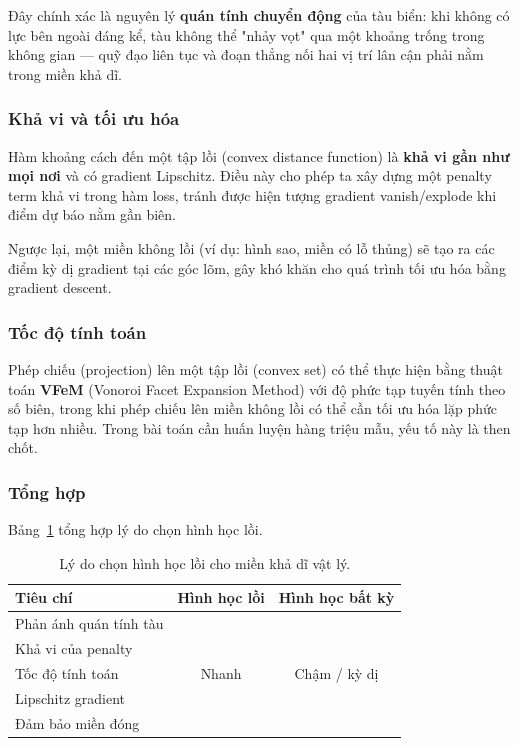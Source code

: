 \documentclass{IEEEtran}
\DeclareRobustCommand{\cmark}{\ding{51}}
\DeclareRobustCommand{\xmark}{\ding{55}}
\begin{document}
Đây chính xác là nguyên lý \textbf{quán tính chuyển động} của tàu biển:
khi không có lực bên ngoài đáng kể, tàu không thể "nhảy vọt" qua
một khoảng trống trong không gian --- quỹ đạo liên tục và đoạn thẳng
nối hai vị trí lân cận phải nằm trong miền khả dĩ.

\subsubsection{Khả vi và tối ưu hóa}
Hàm khoảng cách đến một tập lồi (convex distance function)
là \textbf{khả vi gần như mọi nơi} và có gradient Lipschitz.
Điều này cho phép ta xây dựng một penalty term
khả vi trong hàm loss, tránh được hiện tượng gradient vanish/explode
khi điểm dự báo nằm gần biên.

Ngược lại, một miền không lồi (ví dụ: hình sao, miền có lỗ thủng)
sẽ tạo ra các điểm kỳ dị gradient tại các góc lõm,
gây khó khăn cho quá trình tối ưu hóa bằng gradient descent.

\subsubsection{Tốc độ tính toán}
Phép chiếu (projection) lên một tập lồi (convex set) có thể thực hiện
bằng thuật toán \textbf{VFeM} (Vonoroi Facet Expansion Method)
với độ phức tạp tuyến tính theo số biên, trong khi phép chiếu lên
miền không lồi có thể cần tối ưu hóa lặp phức tạp hơn nhiều.
Trong bài toán cần huấn luyện hàng triệu mẫu, yếu tố này là then chốt.

\subsubsection{Tổng hợp}
Bảng~\ref{tab:convex-reason} tổng hợp lý do chọn hình học lồi.

\begin{table}[H]
\centering
\caption{Lý do chọn hình học lồi cho miền khả dĩ vật lý.}
\label{tab:convex-reason}
\begin{tabular}{p{3.0cm}cc}
\toprule
Tiêu chí              & Hình học lồi & Hình học bất kỳ \\
\midrule
Phản ánh quán tính tàu  & \cmark       & \cmark          \\
Khả vi của penalty       & \cmark       & \xmark          \\
Tốc độ tính toán       & Nhanh        & Chậm / kỳ dị   \\
Lipschitz gradient      & \cmark       & \xmark          \\
Đảm bảo miền đóng       & \cmark       & \cmark          \\
\bottomrule
\end{tabular}
\end{table}
\end{document}
